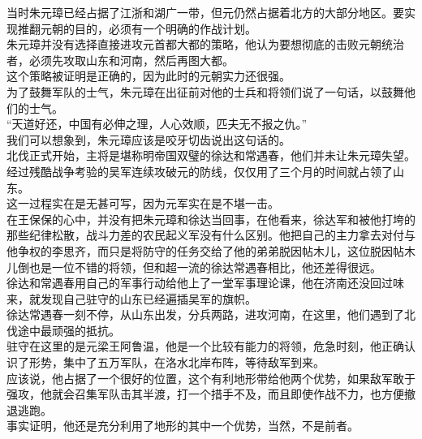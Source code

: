 \begin{multicols}{\theparacolNo}
当时朱元璋已经占据了江浙和湖广一带，但元仍然占据着北方的大部分地区。要实现推翻元朝的目的，必须有一个明确的作战计划。\\

朱元璋并没有选择直接进攻元首都大都的策略，他认为要想彻底的击败元朝统治者，必须先攻取山东和河南，然后再图大都。\\

这个策略被证明是正确的，因为此时的元朝实力还很强。\\

为了鼓舞军队的士气，朱元璋在出征前对他的士兵和将领们说了一句话，以鼓舞他们的士气。\\

“天道好还，中国有必伸之理，人心效顺，匹夫无不报之仇。”\\

我们可以想象到，朱元璋应该是咬牙切齿说出这句话的。\\

北伐正式开始，主将是堪称明帝国双璧的徐达和常遇春，他们并未让朱元璋失望。经过残酷战争考验的吴军连续攻破元的防线，仅仅用了三个月的时间就占领了山东。\\

这一过程实在是无甚可写，因为元军实在是不堪一击。\\

在王保保的心中，并没有把朱元璋和徐达当回事，在他看来，徐达军和被他打垮的那些纪律松散，战斗力差的农民起义军没有什么区别。他把自己的主力拿去对付与他争权的李思齐，而只是将防守的任务交给了他的弟弟脱因帖木儿，这位脱因帖木儿倒也是一位不错的将领，但和超一流的徐达常遇春相比，他还差得很远。\\

徐达和常遇春用自己的军事行动给他上了一堂军事理论课，他在济南还没回过味来，就发现自己驻守的山东已经遍插吴军的旗帜。\\

徐达常遇春一刻不停，从山东出发，分兵两路，进攻河南，在这里，他们遇到了北伐途中最顽强的抵抗。\\

驻守在这里的是元梁王阿鲁温，他是一个比较有能力的将领，危急时刻，他正确认识了形势，集中了五万军队，在洛水北岸布阵，等待敌军到来。\\

应该说，他占据了一个很好的位置，这个有利地形带给他两个优势，如果敌军敢于强攻，他就会召集军队击其半渡，打一个措手不及，而且即使作战不力，也方便撤退逃跑。\\

事实证明，他还是充分利用了地形的其中一个优势，当然，不是前者。\\


\end{multicols}
